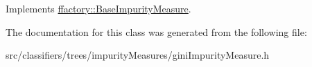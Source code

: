 Implements \hyperlink{classffactory_1_1_base_impurity_measure_ad0e0127a42c1ece9658ebf07e2b26efe}{ffactory\-::\-Base\-Impurity\-Measure}.



The documentation for this class was generated from the following file\-:\begin{DoxyCompactItemize}
\item 
src/classifiers/trees/impurity\-Measures/gini\-Impurity\-Measure.\-h\end{DoxyCompactItemize}
